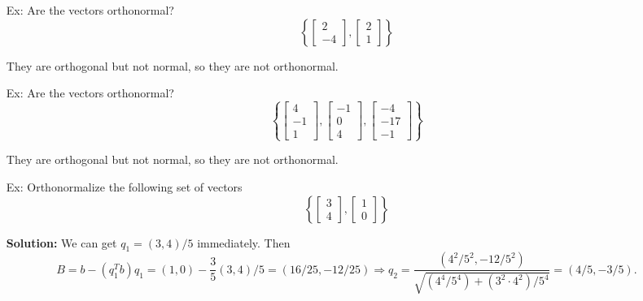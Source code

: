\documentclass[reqno]{amsart}
\theoremstyle{definition}
\begin{document}
\begin{enumerate}

\item[Ex:  ]  Are the vectors orthonormal?
%
\begin{equation*}
\left\lbrace\begin{bmatrix}
2\\
-4
\end{bmatrix}, \begin{bmatrix}
2\\
1
\end{bmatrix}\right\rbrace
\end{equation*}

They are orthogonal but not normal, so they are not orthonormal.

\item[Ex:  ]  Are the vectors orthonormal?
%
\begin{equation*}
\left\lbrace\begin{bmatrix}
4\\
-1\\
1
\end{bmatrix}, \begin{bmatrix}
-1\\
0\\
4
\end{bmatrix}, \begin{bmatrix}
-4\\
-17\\
-1
\end{bmatrix}\right\rbrace
\end{equation*}

They are orthogonal but not normal, so they are not orthonormal.

\item[Ex:  ]  Orthonormalize the following set of vectors
%
\begin{equation*}
\left\lbrace\begin{bmatrix}
3\\
4
\end{bmatrix}, \begin{bmatrix}
1\\
0
\end{bmatrix}\right\rbrace
\end{equation*}

\textbf{Solution:  }
We can get $\boxed{q_1 = (3,4)/5}$ immediately.  Then
%
\begin{equation*}
B = b - (q_1^Tb)q_1 = (1,0) - \frac{3}{5}(3,4)/5 = \boxed{(16/25, -12/25)}
\Rightarrow q_2 = \frac{(4^2/5^2, -12/5^2)}{\sqrt{(4^4/5^4) + (3^2\cdot 4^2)/5^4}}
= \boxed{(4/5, -3/5)}.
\end{equation*}


\end{enumerate}
\end{document}
